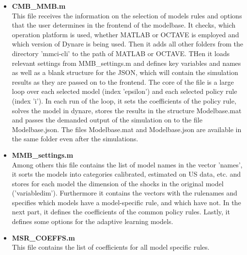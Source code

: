 \begin{itemize}
\item \textbf{CMB\_MMB.m}\\
This file receives the information on the selection of models rules and options that the user determines in the frontend of the modelbase. It checks, which operation platform is used, whether MATLAB or OCTAVE is employed and which version of Dynare is being used. Then it adds all other folders from the directory 'mmci-cli' to the path of MATLAB or OCTAVE. THen it loads relevant settings from MMB\_settings.m and defines key variables and names as well as a blank structure for the JSON, which will contain the simulation results as they are passed on to the frontend. The core of the file is a large loop over each selected model (index 'epsilon') and each selected policy rule (index 'i'). In each run of the loop, it sets the coefficients of the policy rule, solves the model in dynare, stores the results in the structure Modelbase.mat and passes the demanded output of the simulation on to the file Modelbase.json. The files Modelbase.mat and Modelbase.json are available in the same folder even after the simulations.
\item \textbf{MMB\_settings.m}\\
Among others this file contains the list of model names in the vector 'names', it sorts the models into categories calibrated, estimated on US data, etc. and stores for each model the dimension of the shocks in the original model ('variabledim'). Furthermore it contains the vectors with the rulenames and specifies which models have a model-specific rule, and which have not. In the next part, it defines the coefficients of the common policy rules. Lastly, it defines some options for the adaptive learning models.
\item \textbf{MSR\_COEFFS.m}\\
This file contains the list of coefficients for all model specific rules.
\end{itemize}



